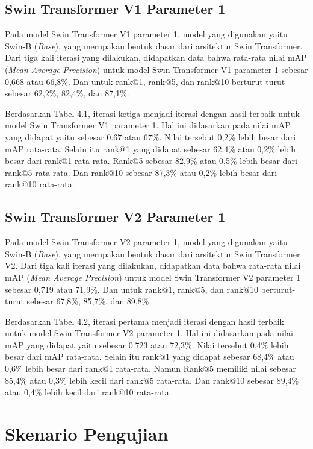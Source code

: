 \subsection{Swin Transformer V1 Parameter 1}

Pada model Swin Transformer V1 parameter 1, model yang digunakan yaitu Swin-B (\emph{Base}), yang merupakan bentuk 
dasar dari arsitektur Swin Transformer. Dari tiga kali iterasi yang dilakukan, didapatkan data bahwa rata-rata nilai 
mAP (\emph{Mean Average Precision}) untuk model Swin Transformer V1 parameter 1 sebesar 0,668 atau 66,8\%. Dan untuk 
rank@1, rank@5, dan rank@10 berturut-turut sebesar 62,2\%, 82,4\%, dan 87,1\%. 

Berdasarkan Tabel 4.1, iterasi ketiga menjadi iterasi dengan hasil terbaik untuk model Swin Transformer V1 parameter 1. 
Hal ini didasarkan pada nilai mAP yang didapat yaitu sebesar 0.67 atau 67\%. Nilai tersebut 0,2\% lebih besar dari 
mAP rata-rata. Selain itu rank@1 yang didapat sebesar 62,4\% atau 0,2\% lebih besar dari rank@1 rata-rata. Rank@5 sebesar 
82,9\% atau 0,5\% lebih besar dari rank@5 rata-rata. Dan rank@10 sebesar 87,3\% atau 0,2\% lebih besar dari rank@10 
rata-rata.

\subsection{Swin Transformer V2 Parameter 1}

Pada model Swin Transformer V2 parameter 1, model yang digunakan yaitu Swin-B (\emph{Base}), yang merupakan bentuk 
dasar dari arsitektur Swin Transformer V2. Dari tiga kali iterasi yang dilakukan, didapatkan data bahwa rata-rata nilai 
mAP (\emph{Mean Average Precision}) untuk model Swin Transformer V2 parameter 1 sebesar 0,719 atau 71,9\%. Dan untuk 
rank@1, rank@5, dan rank@10 berturut-turut sebesar 67,8\%, 85,7\%, dan 89,8\%. 

Berdasarkan Tabel 4.2, iterasi pertama menjadi iterasi dengan hasil terbaik untuk model Swin Transformer V2 parameter 1. 
Hal ini didasarkan pada nilai mAP yang didapat yaitu sebesar 0.723 atau 72,3\%. Nilai tersebut 0,4\% lebih besar dari 
mAP rata-rata. Selain itu rank@1 yang didapat sebesar 68,4\% atau 0,6\% lebih besar dari rank@1 rata-rata. Namun 
Rank@5 memiliki nilai sebesar 85,4\% atau 0,3\% lebih kecil dari rank@5 rata-rata. Dan rank@10 sebesar 89,4\% atau 0,4\% 
lebih kecil dari rank@10 rata-rata.

\section{Skenario Pengujian}
\label{sec:skenariopengujian}


